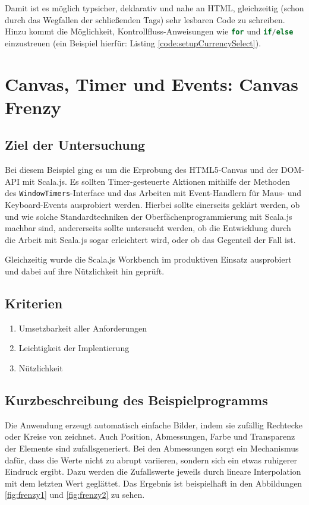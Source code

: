 \documentclass[a4paper, 12pt, hidelinks, listof=totoc, listoftables=totoc, bibliography=totoc]{scrreprt}
\newcommand{\code}[1]{\lstinline[language=Scala, style=inline]|#1|}
\newcommand{\scala}[1]{\lstinline[language=Scala, style=inline]|#1|}
\begin{document}
Damit ist es möglich typsicher, deklarativ und nahe an HTML, gleichzeitig (schon durch das Wegfallen der schließenden Tags) sehr lesbaren Code zu schreiben. Hinzu kommt die Möglichkeit, Kontrollfluss-Anweisungen wie \scala{for} und \scala{if/else} einzustreuen (ein Beispiel hierfür: Listing \ref{code:setupCurrencySelect}).



\section{Canvas, Timer und Events: Canvas Frenzy}

\subsection{Ziel der Untersuchung}

Bei diesem Beispiel ging es um die Erprobung des HTML5-Canvas und der DOM-API mit Scala.js. Es sollten Timer-gesteuerte Aktionen mithilfe der Methoden des \code{WindowTimers}-Interface und das Arbeiten mit Event-Handlern für Maus- und Keyboard-Events ausprobiert werden. Hierbei sollte einerseits geklärt werden, ob und wie solche Standardtechniken der Oberfächenprogrammierung mit Scala.js machbar sind, andererseits sollte untersucht werden, ob die Entwicklung durch die Arbeit mit Scala.js sogar erleichtert wird, oder ob das Gegenteil der Fall ist.

Gleichzeitig wurde die Scala.js Workbench im produktiven Einsatz ausprobiert und dabei auf ihre Nützlichkeit hin geprüft.

\subsection{Kriterien}

\begin{enumerate}
	\item Umsetzbarkeit aller Anforderungen
	\item Leichtigkeit der Implentierung
	\item Nützlichkeit
\end{enumerate}

\subsection{Kurzbeschreibung des Beispielprogramms}

Die Anwendung erzeugt automatisch einfache Bilder, indem sie zufällig Rechtecke oder Kreise von zeichnet. Auch Position, Abmessungen, Farbe und Transparenz der Elemente sind zufallsgeneriert. Bei den Abmessungen sorgt ein Mechanismus dafür, dass die Werte nicht zu abrupt variieren, sondern sich ein etwas ruhigerer Eindruck ergibt. Dazu werden die Zufallswerte jeweils durch lineare Interpolation mit dem letzten Wert geglättet. Das Ergebnis ist beispielhaft in den Abbildungen \ref{fig:frenzy1} und \ref{fig:frenzy2} zu sehen.
\end{document}
